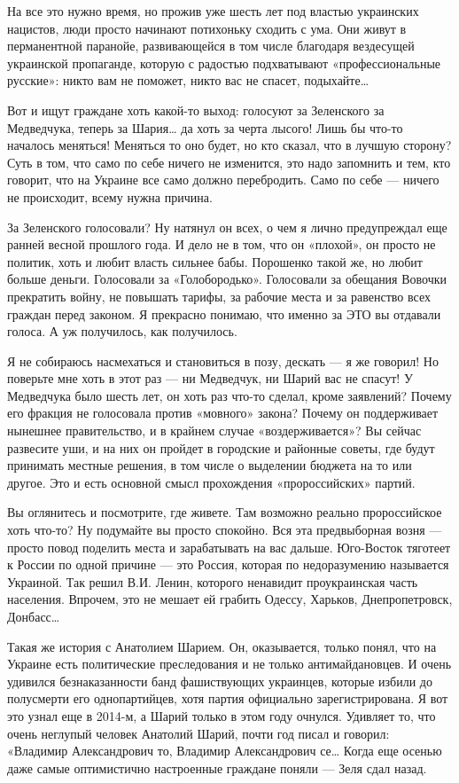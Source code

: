 \documentclass[a4paper,11pt]{extreport}
\begin{document}
На все это нужно время, но прожив уже шесть лет под властью украинских
нацистов, люди просто начинают потихоньку сходить с ума. Они живут в
перманентной паранойе, развивающейся в том числе благодаря вездесущей
украинской пропаганде, которую с радостью подхватывают «профессиональные
русские»: никто вам не поможет, никто вас не спасет, подыхайте…

Вот и ищут граждане хоть какой-то выход: голосуют за Зеленского за Медведчука,
теперь за Шария… да хоть за черта лысого! Лишь бы что-то началось меняться!
Меняться то оно будет, но кто сказал, что в лучшую сторону? Суть в том, что
само по себе ничего не изменится, это надо запомнить и тем, кто говорит, что на
Украине все само должно перебродить. Само по себе --- ничего не происходит, всему
нужна причина.

За Зеленского голосовали? Ну натянул он всех, о чем я лично предупреждал еще
ранней весной прошлого года. И дело не в том, что он «плохой», он просто не
политик, хоть и любит власть сильнее бабы. Порошенко такой же, но любит больше
деньги. Голосовали за «Голобородько». Голосовали за обещания Вовочки прекратить
войну, не повышать тарифы, за рабочие места и за равенство всех граждан перед
законом. Я прекрасно понимаю, что именно за ЭТО вы отдавали голоса. А уж
получилось, как получилось.

Я не собираюсь насмехаться и становиться в позу, дескать --- я же говорил! Но
поверьте мне хоть в этот раз --- ни Медведчук, ни Шарий вас не спасут! У
Медведчука было шесть лет, он хоть раз что-то сделал, кроме заявлений? Почему
его фракция не голосовала против «мовного» закона? Почему он поддерживает
нынешнее правительство, и в крайнем случае «воздерживается»? Вы сейчас
развесите уши, и на них он пройдет в городские и районные советы, где будут
принимать местные решения, в том числе о выделении бюджета на то или другое.
Это и есть основной смысл прохождения «пророссийских» партий.

Вы оглянитесь и посмотрите, где живете. Там возможно реально пророссийское хоть
что-то? Ну подумайте вы просто спокойно. Вся эта предвыборная возня --- просто
повод поделить места и зарабатывать на вас дальше. Юго-Восток тяготеет к России
по одной причине --- это Россия, которая по недоразумению называется Украиной.
Так решил В.И. Ленин, которого ненавидит проукраинская часть населения.
Впрочем, это не мешает ей грабить Одессу, Харьков, Днепропетровск, Донбасс…

Такая же история с Анатолием Шарием. Он, оказывается, только понял, что на
Украине есть политические преследования и не только антимайдановцев. И очень
удивился безнаказанности банд фашиствующих украинцев, которые избили до
полусмерти его однопартийцев, хотя партия официально зарегистрирована. Я вот
это узнал еще в 2014-м, а Шарий только в этом году очнулся. Удивляет то, что
очень неглупый человек Анатолий Шарий, почти год писал и говорил: «Владимир
Александрович то, Владимир Александрович се… Когда еще осенью даже самые
оптимистично настроенные граждане поняли --- Зеля сдал назад.
\end{document}
